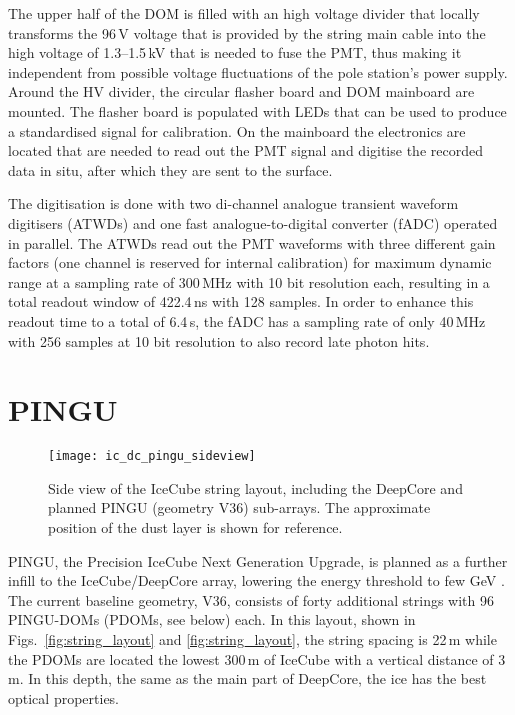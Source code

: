 The upper half of the DOM is filled with an high voltage divider that locally 
transforms the 96\,V voltage that is provided by the string main cable into the 
high voltage of 1.3--1.5\,kV that is needed to fuse the PMT, thus making it 
independent from possible voltage fluctuations of the pole station's power 
supply. Around the HV divider, the circular flasher board and DOM mainboard are 
mounted. The flasher board is populated with LEDs that can be used to produce a 
standardised signal for calibration. On the mainboard the electronics are 
located that are needed to read out the PMT signal and digitise the recorded 
data in situ, after which they are sent to the surface.

The digitisation is done with two di-channel analogue transient waveform
digitisers (ATWDs) and one fast analogue-to-digital converter (fADC) operated
in parallel. The ATWDs read out the PMT waveforms with three different gain
factors (one channel is reserved for internal calibration) for maximum dynamic
range at a sampling rate of 300\,MHz with 10 bit resolution each, resulting in
a total readout window of 422.4\,ns with 128 samples. In order to enhance this
readout time to a total of 6.4\,\textmu s, the fADC has a sampling rate of only
40\,MHz with 256 samples at 10 bit resolution to also record late photon hits.



\section{PINGU}
\label{sec:PINGU}

\begin{figure}[thp]
 \centering
 \texttt{[image: ic\_dc\_pingu\_sideview]}
 \caption{Side view of the IceCube string layout, including the DeepCore and
  planned PINGU (geometry V36) sub-arrays. The approximate position of the dust
  layer is shown for reference.}
 \label{fig:string_layout_side}
\end{figure}

PINGU, the Precision IceCube Next Generation Upgrade, is planned as a further 
infill to the IceCube/DeepCore array, lowering the energy threshold to few GeV 
\cite{LoI}. The current baseline geometry, V36, consists of forty additional 
strings with 96 PINGU-DOMs (PDOMs, see below) each. In this layout, shown in
Figs.~\ref{fig:string_layout} and \ref{fig:string_layout}, the string spacing is
22\,m while the PDOMs are located the lowest 300\,m of IceCube with a vertical
distance of 3\,m. In this depth, the same as the main part of DeepCore, the ice
has the best optical properties.

